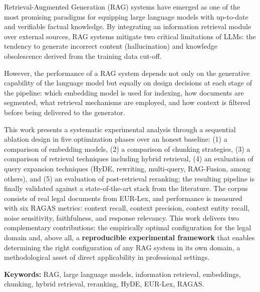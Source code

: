 \documentclass[11pt, a4paper, oneside]{report}
\begin{document}
Retrieval-Augmented Generation (RAG) systems have emerged as one of the most promising
paradigms for equipping large language models with up-to-date and verifiable factual
knowledge. By integrating an information retrieval module over external sources, RAG
systems mitigate two critical limitations of LLMs: the tendency to generate incorrect
content (hallucination) and knowledge obsolescence derived from the training data cut-off.

However, the performance of a RAG system depends not only on the generative capability of
the language model but equally on design decisions at each stage of the pipeline: which
embedding model is used for indexing, how documents are segmented, what retrieval
mechanisms are employed, and how context is filtered before being delivered to the
generator.

This work presents a systematic experimental analysis through a sequential ablation design
in five optimization phases over an honest baseline: (1) a comparison of embedding models,
(2) a comparison of chunking strategies, (3) a comparison of retrieval techniques including
hybrid retrieval, (4) an evaluation of query expansion techniques (HyDE, rewriting,
multi-query, RAG-Fusion, among others), and (5) an evaluation of post-retrieval reranking;
the resulting pipeline is finally validated against a state-of-the-art stack from the
literature. The corpus consists of real legal documents from EUR-Lex, and performance is
measured with six RAGAS metrics: context recall, context precision, context entity recall,
noise sensitivity, faithfulness, and response relevancy. This work delivers two
complementary contributions: the empirically optimal configuration for the legal domain
and, above all, a \textbf{reproducible experimental framework} that enables determining the
right configuration of any RAG system in its own domain, a methodological asset of direct
applicability in professional settings.

\vspace{1em}
\noindent\textbf{Keywords:} RAG, large language models, information retrieval, embeddings,
chunking, hybrid retrieval, reranking, HyDE, EUR-Lex, RAGAS.

\clearpage

\tableofcontents
\clearpage

\end{document}
